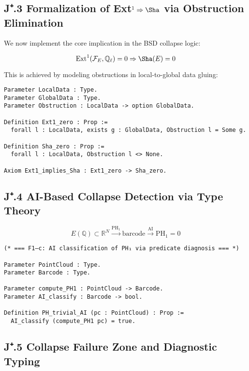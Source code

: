 \documentclass[11pt]{article}
\theoremstyle{definition}
\begin{document}
\subsection*{J⁺.3 Formalization of Ext${}^1 \Rightarrow \Sha$ via Obstruction Elimination}

We now implement the core implication in the BSD collapse logic:

\[
\mathrm{Ext}^1(\mathcal{F}_E, \mathbb{Q}_\ell) = 0 \Rightarrow \Sha(E) = 0
\]

This is achieved by modeling obstructions in local-to-global data gluing:

\begin{lstlisting}[language=Coq, caption=Ext^1-to-Sha Implication in Coq]
Parameter LocalData : Type.
Parameter GlobalData : Type.
Parameter Obstruction : LocalData -> option GlobalData.

Definition Ext1_zero : Prop :=
  forall l : LocalData, exists g : GlobalData, Obstruction l = Some g.

Definition Sha_zero : Prop :=
  forall l : LocalData, Obstruction l <> None.

Axiom Ext1_implies_Sha : Ext1_zero -> Sha_zero.
\end{lstlisting}

\subsection*{J⁺.4 AI-Based Collapse Detection via Type Theory}

\[
E(\mathbb{Q}) \subset \mathbb{R}^N \xrightarrow{\mathrm{PH}_1} \text{barcode} \xrightarrow{\text{AI}} \mathrm{PH}_1 = 0
\]

\begin{lstlisting}[language=Coq, caption=PH₁ Diagnosis via AI Classifier]
(* === F1–c: AI classification of PH₁ via predicate diagnosis === *)

Parameter PointCloud : Type.
Parameter Barcode : Type.

Parameter compute_PH1 : PointCloud -> Barcode.
Parameter AI_classify : Barcode -> bool.

Definition PH_trivial_AI (pc : PointCloud) : Prop :=
  AI_classify (compute_PH1 pc) = true.
\end{lstlisting}

\subsection*{J⁺.5 Collapse Failure Zone and Diagnostic Typing}
\end{document}
